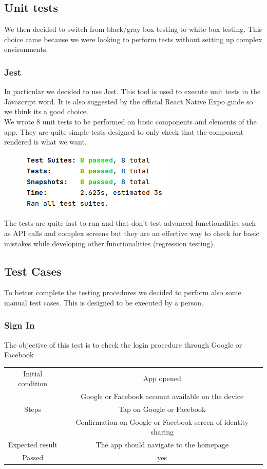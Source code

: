 \documentclass[10pt]{article}
\begin{document}
    \subsection{Unit tests}
    We then decided to switch from black/gray box testing to white box testing. This choice came because we were looking to perform tests without setting up complex environments.
    \subsubsection{Jest}
    In particular we decided to use Jest. This tool is used to execute unit tests in the Javascript word. It is also suggested by the official React Native Expo guide so we think its a good choice.\\
    We wrote 8 unit tests to be performed on basic components and elements of the app. They are quite simple tests designed to only check that the component rendered is what we want.
    \begin{figure}[H]
    	\includegraphics[scale=0.6]{resources/unittest.png}
    \end{figure}
    The tests are quite fast to run and that don't test advanced functionalities such as API calls and complex screens but they are an effective way to check for basic mistakes while developing other functionalities (regression testing).
    \subsection{Test Cases}
    To better complete the testing procedures we decided to perform also some manual test cases. This is designed to be executed by a person.
    \subsubsection{Sign In}
    The objective of this test is to check the login procedure through Google or Facebook
    \begin{center}
    	\begin{tabular}{ |c|c| } 
    		\hline
    		Initial condition & App opened\\
    		 & Google or Facebook account available on the device\\
    		\hline
    		Steps & Tap on Google or Facebook\\
    		 & Confirmation on Google or Facebook screen of identity sharing\\
    		\hline
    		Expected result & The app should navigate to the homepage\\
    		\hline
    		Passed & yes\\
    		\hline
    	\end{tabular}
    \end{center}
\end{document}

